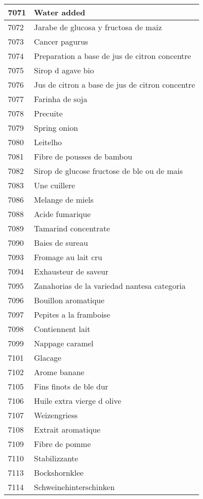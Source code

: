 \begin{longtable}{|l|l|}
7071 & Water added \\ \hline 
7072 & Jarabe de glucosa y fructosa de maiz \\ \hline 
7073 & Cancer pagurus \\ \hline 
7074 & Preparation a base de jus de citron concentre \\ \hline 
7075 & Sirop d agave bio \\ \hline 
7076 & Jus de citron a base de jus de citron concentre \\ \hline 
7077 & Farinha de soja \\ \hline 
7078 & Precuite \\ \hline 
7079 & Spring onion \\ \hline 
7080 & Leitelho \\ \hline 
7081 & Fibre de pousses de bambou \\ \hline 
7082 & Sirop de glucose fructose de ble ou de mais \\ \hline 
7083 & Une cuillere \\ \hline 
7086 & Melange de miels \\ \hline 
7088 & Acide fumarique \\ \hline 
7089 & Tamarind concentrate \\ \hline 
7090 & Baies de sureau \\ \hline 
7093 & Fromage au lait cru \\ \hline 
7094 & Exhausteur de saveur \\ \hline 
7095 & Zanahorias de la variedad nantesa categoria \\ \hline 
7096 & Bouillon aromatique \\ \hline 
7097 & Pepites a la framboise \\ \hline 
7098 & Contiennent lait \\ \hline 
7099 & Nappage caramel \\ \hline 
7101 & Glacage \\ \hline 
7102 & Arome banane \\ \hline 
7105 & Fins finots de ble dur \\ \hline 
7106 & Huile extra vierge d olive \\ \hline 
7107 & Weizengriess \\ \hline 
7108 & Extrait aromatique \\ \hline 
7109 & Fibre de pomme \\ \hline 
7110 & Stabilizzante \\ \hline 
7113 & Bockshornklee \\ \hline 
7114 & Schweinehinterschinken \\ \hline 

\end{longtable}
